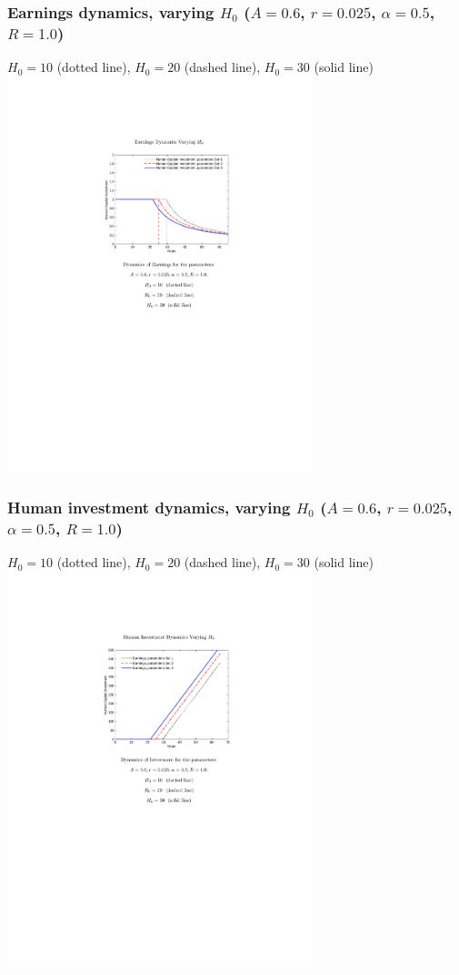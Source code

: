 \documentclass[12pt,compress,handout]{beamer}  %
\begin{document}
\begin{frame}
\frametitle{Earnings dynamics, varying $H_{0}$ ($A=0.6$, $r=0.025$,
$\alpha = 0.5$, $R=1.0$)}
\begin{center}
{\footnotesize $H_{0} = 10$ (dotted line), $H_{0} = 20$ (dashed
line), $H_{0} = 30$ (solid line)}
\includegraphics[width=3.5in]{include/fig-hc-earn-series-11.pdf}
\end{center}
\end{frame}


\begin{frame}
\frametitle{Human investment dynamics, varying $H_{0}$ ($A=0.6$,
$r=0.025$, $\alpha = 0.5$, $R=1.0$)}
\begin{center}
{\footnotesize $H_{0} = 10$ (dotted line), $H_{0} = 20$ (dashed
line), $H_{0} = 30$ (solid line)}
\includegraphics[width=3.5in]{include/fig-hc-earn-series-12.pdf}
\end{center}
\end{frame}
\end{document}
